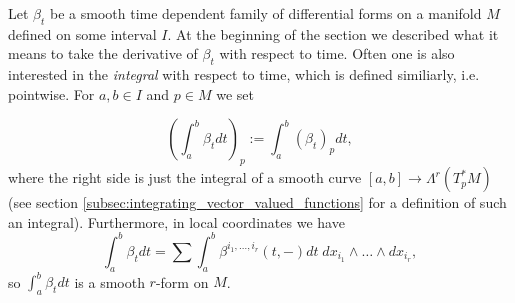 
Let $\beta_t$ be a smooth time dependent family of differential forms on a manifold $M$ defined on some interval $I$. At the beginning of the section we described what it means to take the derivative of $\beta_t$ with respect to time. Often one is also interested in the \textit{integral} with respect to time, which is defined similiarly, i.e. pointwise. For $a ,b \in I$ and $p \in M$ we set

\[
\left( \int_{a}^{b} \beta_t dt \right)_p := \int_{a}^{b} (\beta_t)_p dt,
\]
where the right side is just the integral of a smooth curve $[a,b] \to \Lambda^r(T_p^\ast M)$ (see section \ref{subsec:integrating_vector_valued_functions} for a definition of such an integral). Furthermore, in local coordinates we have
\[
    \int_{a}^{b} \beta_t dt = \sum \int_{a}^{b} \beta^{i_1,\ldots,i_r}(t,-) dt \; dx_{i_1} \wedge \ldots \wedge dx_{i_r},
\]
so $\int_{a}^{b} \beta_t dt$ is a smooth $r$-form on $M$.
